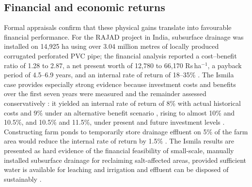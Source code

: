 \documentclass[11pt]{article}
\begin{document}
\subsection{Financial and economic returns}
Formal appraisals confirm that these physical gains translate into favourable financial performance. For the RAJAD project in India, subsurface drainage was installed on 14{,}925 ha using over 3.04 million metres of locally produced corrugated perforated PVC pipe; the financial analysis reported a cost--benefit ratio of 1.28 to 2.87, a net present worth of 12{,}780 to 66{,}170 Rs\,ha$^{-1}$, a payback period of 4.5--6.9 years, and an internal rate of return of 18--35\% \parencite{Gopalakrishnan2007}. The Ismila case provides especially strong evidence because investment costs and benefits over the first seven years were measured and the remainder assessed conservatively \parencite{Datta2000}: it yielded an internal rate of return of 8\% with actual historical costs and 9\% under an alternative benefit scenario \parencite{Datta2000,Datta2002}, rising to almost 10\% and 10.5\%, and 10.5\% and 11.5\%, under present and future investment levels \parencite{Datta2000}. Constructing farm ponds to temporarily store drainage effluent on 5\% of the farm area would reduce the internal rate of return by 1.5\% \parencite{Datta2000}. The Ismila results are presented as hard evidence of the financial feasibility of small-scale, manually installed subsurface drainage for reclaiming salt-affected areas, provided sufficient water is available for leaching and irrigation and effluent can be disposed of sustainably \parencite{Datta2000}.
\end{document}
